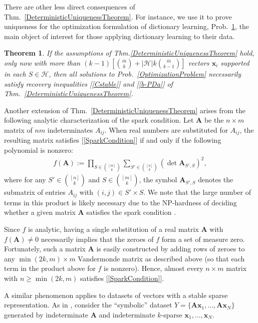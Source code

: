 \documentclass[9pt,twocolumn]{pnas-new}
\newtheorem{theorem}{Theorem}
\renewcommand{\eqref}[1]{\textnormal{[\ref{#1}]}}
\begin{document}
There are other less direct consequences of Thm.~\ref{DeterministicUniquenessTheorem}.  For instance, we use it to prove uniqueness for the optimization formulation of dictionary learning, Prob.~\ref{SLCopt}, the main object of interest for those applying dictionary learning to their data.

\begin{theorem}\label{SLCopt}
If the assumptions of Thm.\ref{DeterministicUniquenessTheorem} hold, only now with more than $(k-1)\left[ {\bar m \choose k} + |\mathcal{H}|k{\bar m \choose k-1}\right]$ vectors $\mathbf{x}_i$ supported in each $S \in \mathcal{H}$, then all solutions to Prob.~\ref{OptimizationProblem} necessarily satisfy recovery inequalities \eqref{Cstable} and \eqref{b-PDa} of Thm.~\ref{DeterministicUniquenessTheorem}.
\end{theorem}

Another extension of Thm.~\ref{DeterministicUniquenessTheorem} arises from the following analytic characterization of the spark condition.  Let $\mathbf{A}$  be the $n \times m$ matrix of $nm$ indeterminates $A_{ij}$. When real numbers are substituted for $A_{ij}$, the resulting matrix satisfies \eqref{SparkCondition} if and only if the following polynomial is nonzero:
\begin{align*}
f(\mathbf{A}) := \prod_{S \in {[m] \choose k}} \sum_{S' \in {[n] \choose k}} (\det \mathbf{A}_{S',S})^2,
\end{align*}
%
where for any $S' \in {[n] \choose k}$ and $S \in {[m] \choose k}$, the symbol $\mathbf{A}_{S',S}$ denotes the submatrix of entries $A_{ij}$ with $(i,j) \in S' \times S$.   We note that the large number of terms in this product is likely necessary due to the NP-hardness of deciding whether a given matrix $\mathbf{A}$ satisfies the spark condition \cite{tillmann2014computational}.

Since $f$ is analytic, having a single substitution of a real matrix $\mathbf{A}$ with $f(\mathbf{A}) \neq 0$ necessarily implies that the zeroes of $f$ form a set of measure zero. Fortunately, such a matrix $\mathbf{A}$ is easily constructed by adding rows of zeroes to any $\min(2k,m) \times m$ Vandermonde matrix as described above (so that each term in the product above for $f$ is nonzero). Hence, almost every $n \times m$ matrix with $n \geq \min(2k,m)$ satisfies \eqref{SparkCondition}.

A similar phenomenon applies to datasets of vectors with a stable sparse representation. As in \cite[Sec.~IV]{Hillar15}, consider the ``symbolic'' dataset $Y = \{\mathbf{A}\mathbf{x}_1,\ldots,\mathbf{A} \mathbf{x}_N\}$ generated by indeterminate $\mathbf{A}$ and indeterminate $k$-sparse $\mathbf{x}_1, \ldots, \mathbf{x}_N$.  
\end{document}

